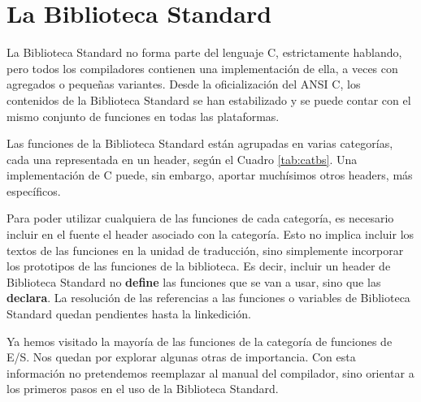 



\chapter{La Biblioteca Standard}
La Biblioteca Standard no forma parte del lenguaje C, estrictamente hablando, pero todos
los compiladores contienen una implementación de ella, a veces con agregados o pequeñas
variantes. Desde la oficialización del ANSI C, los contenidos de la Biblioteca
Standard se han estabilizado y se puede contar con el mismo conjunto de
funciones en todas las plataformas.

Las funciones de la Biblioteca Standard están agrupadas en varias categorías, cada una representada en un header, según el Cuadro \ref{tab:catbs}. Una
implementación de C puede, sin embargo, aportar muchísimos otros headers, más específicos. 

Para poder utilizar cualquiera de las funciones de cada categoría, es necesario
incluir en el fuente el header asociado con la categoría. Esto no
implica incluir los textos de las funciones en la unidad de traducción, sino
simplemente incorporar los prototipos de las funciones de la biblioteca. Es
decir, incluir un header de Biblioteca Standard no \textbf{define} las funciones que se
van a usar, sino que las \textbf{declara}. La resolución de las referencias a las
funciones o variables de Biblioteca Standard quedan pendientes hasta la
linkedición.

Ya hemos visitado la mayoría de las funciones de la categoría de funciones de E/S. Nos
quedan por explorar algunas otras de importancia. Con
esta información no pretendemos reemplazar al manual del compilador, sino
orientar a los primeros pasos en el uso de la Biblioteca Standard.

